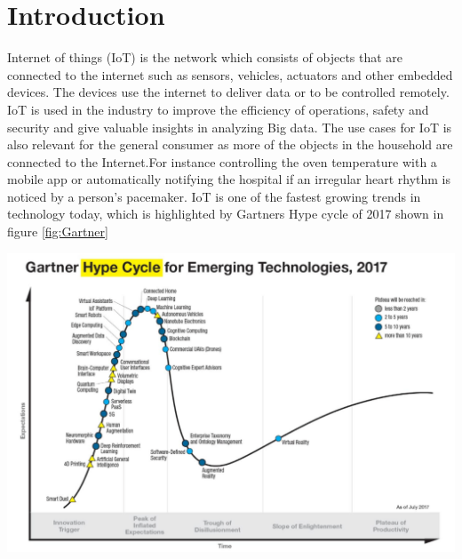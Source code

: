 \chapter{Introduction}



Internet of things (IoT) is the network which consists of objects that are connected to the internet such as sensors, vehicles, actuators and other embedded devices. The devices use the internet to deliver data or to be controlled remotely. IoT is used in the industry to improve the efficiency of operations, safety and security and give valuable insights in analyzing Big data. The use cases for IoT is also relevant for the general consumer as more of the objects in the household are connected to the Internet.For instance controlling the oven temperature with a mobile app or automatically notifying the hospital if an irregular heart rhythm is noticed by a person's pacemaker. IoT is one of the fastest growing trends in technology today, which is highlighted by Gartners Hype cycle of 2017 shown in figure \ref{fig:Gartner}


\begin{minipage}[H!]{0.8\textwidth}
    \centering
    \includegraphics[width=1.2\textwidth]{Images/Gartner.PNG}\\
    \label{fig:Gartner}
\end{minipage}





